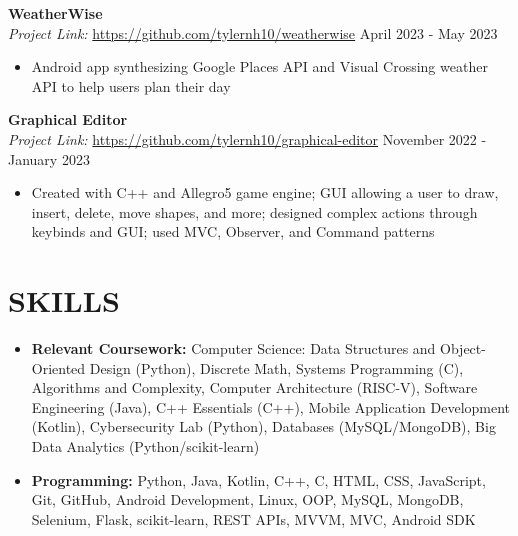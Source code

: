 \documentclass[a4paper,10pt]{extarticle}
\begin{document}
\noindent
\textbf{WeatherWise}\\ %
\textit{Project Link:} \url{https://github.com/tylernh10/weatherwise} \hfill April 2023 - May 2023 %
\begin{itemize}[topsep=3pt]
    \item Android app synthesizing Google Places API and Visual Crossing weather API to help users plan their day %
\end{itemize}

\noindent
\textbf{Graphical Editor}\\ %
\textit{Project Link:} \url{https://github.com/tylernh10/graphical-editor} \hfill November 2022 - January 2023 %
\begin{itemize}[topsep=3pt]
    \item Created with C++ and Allegro5 game engine; GUI allowing a user to draw, insert, delete, move shapes, and more; designed complex actions through keybinds and  GUI; used MVC, Observer, and Command patterns %
\end{itemize}

\section*{SKILLS}
\begin{itemize}
    \item \textbf{Relevant Coursework:} Computer Science: Data Structures and Object-Oriented Design (Python), Discrete Math, Systems Programming (C), Algorithms and Complexity, Computer Architecture (RISC-V), Software Engineering (Java), C++ Essentials (C++), Mobile Application Development (Kotlin), Cybersecurity Lab (Python), Databases (MySQL/MongoDB), Big Data Analytics (Python/scikit-learn) %
    \item \textbf{Programming:} Python, Java, Kotlin, C++, C, HTML, CSS, JavaScript, Git, GitHub, Android Development, Linux, OOP, MySQL, MongoDB, Selenium, Flask, scikit-learn, REST APIs, MVVM, MVC, Android SDK %
\end{itemize}

\end{document}
